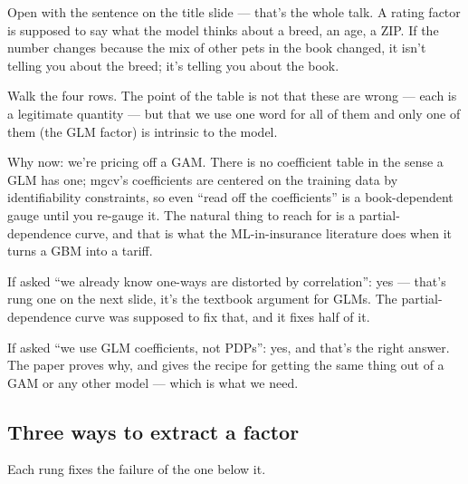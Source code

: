 \documentclass[
  letterpaper,
  DIV=11,
  numbers=noendperiod]{scrartcl}
\begin{document}
Open with the sentence on the title slide --- that's the whole talk. A
rating factor is supposed to say what the model thinks about a breed, an
age, a ZIP. If the number changes because the mix of other pets in the
book changed, it isn't telling you about the breed; it's telling you
about the book.

Walk the four rows. The point of the table is not that these are wrong
--- each is a legitimate quantity --- but that we use one word for all
of them and only one of them (the GLM factor) is intrinsic to the model.

Why now: we're pricing off a GAM. There is no coefficient table in the
sense a GLM has one; mgcv's coefficients are centered on the training
data by identifiability constraints, so even ``read off the
coefficients'' is a book-dependent gauge until you re-gauge it. The
natural thing to reach for is a partial-dependence curve, and that is
what the ML-in-insurance literature does when it turns a GBM into a
tariff.

If asked ``we already know one-ways are distorted by correlation'': yes
--- that's rung one on the next slide, it's the textbook argument for
GLMs. The partial-dependence curve was supposed to fix that, and it
fixes half of it.

If asked ``we use GLM coefficients, not PDPs'': yes, and that's the
right answer. The paper proves why, and gives the recipe for getting the
same thing out of a GAM or any other model --- which is what we need.

\subsection{Three ways to extract a factor}\label{ladder}

Each rung fixes the failure of the one below it.
\end{document}
